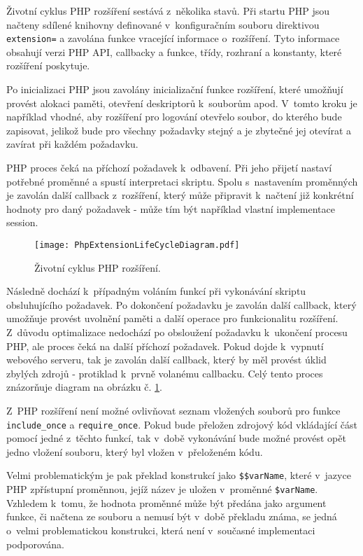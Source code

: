 \documentclass[czech]{ExcelAtFIT}
\newcommand{\function}[1]{\texttt{#1}}
\begin{document}
	Životní cyklus PHP rozšíření sestává z~několika stavů.\cite{phpExtensionLife} Při startu PHP jsou načteny sdílené knihovny definované v~konfiguračním souboru direktivou \function{ex\-ten\-sion=} a zavolána funkce vracející informace o~rozšíření. Tyto informace obsahují verzi PHP API, callbacky a funkce, třídy, rozhraní a konstanty, které rozšíření poskytuje.\cite{phpExtensionStructure}

	Po inicializaci PHP jsou zavolány inicializační funkce rozšíření, které umožňují provést alokaci paměti, otevření deskriptorů k~souborům apod. V~tomto kroku je například vhodné, aby rozšíření pro logování otevřelo soubor, do kterého bude zapisovat, jelikož bude pro všechny požadavky stejný a je zbytečné jej otevírat a zavírat při každém požadavku.

	PHP proces čeká na pří\-cho\-zí požadavek k~odbavení. Při jeho přijetí nastaví potřebné proměnné a spustí interpretaci skriptu. Spolu s~nastavením proměnných je zavolán další callback z~rozšíření, který může připravit k~načtení již konkrétní hodnoty pro daný požadavek - může tím být například vlastní implementace session.

	\begin{figure}[t]
		\centering
		\texttt{[image: PhpExtensionLifeCycleDiagram.pdf]}
		\caption{Životní cyklus PHP rozšíření.}
		\label{fig:phpExtensionLifeCycle}
	\end{figure}


	Následně dochází k~případným voláním funkcí při vykonávání skriptu obsluhujícího požadavek. Po dokončení požadavku je zavolán další callback, který umožňuje provést uvolnění paměti a další operace pro funkcionalitu rozšíření. Z~důvodu optimalizace nedochází po obsloužení požadavku k~ukončení procesu PHP, ale proces čeká na další příchozí požadavek. Pokud dojde k~vypnutí webového serveru, tak je zavolán další callback, který by měl provést úklid zbylých zdrojů - protiklad k~prvně volanému callbacku. Celý tento proces znázorňuje diagram na obrázku č. \ref{fig:phpExtensionLifeCycle}.


	Z~PHP rozšíření není možné ovlivňovat seznam vložených souborů pro funkce \function{include\_once} a \function{re\-qui\-re\_on\-ce}. Pokud bude přeložen zdrojový kód vkládající část pomocí jedné z~těchto funkcí, tak v~době vykonávání bude možné provést opět jedno vložení souboru, který byl vložen v~přeloženém kódu.

	Velmi problematickým je pak překlad konstrukcí jako \function{\$\$varName}, které v~jazyce PHP zpřístupní pro\-měn\-nou, jejíž název je uložen v~proměnné \function{\$varName}. Vzhledem k~tomu, že hodnota proměnné může být předána jako argument funkce, či načtena ze souboru a nemusí být v~době překladu známa, se jedná o~velmi problematickou konstrukci, která není v~současné implementaci podporována.
\end{document}

